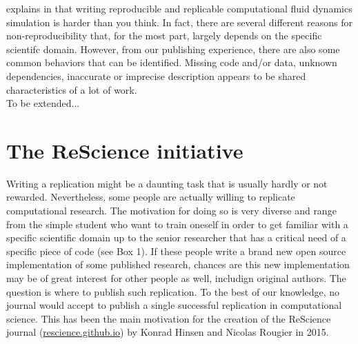 \documentclass[a4paper,10pt, twocolumn]{article}
\begin{document}
\citeauthor{Mesnard:2016} explains in \citep{Mesnard:2016} that writing
reproducible and replicable computational fluid dynamics simulation is harder
than you think. In fact, there are several different reasons for
non-reproducibility that, for the most part, largely depends on the specific
scientifc domain. However, from our publishing experience, there are also some
common behaviors that can be identified. Missing code and/or data, unknown
dependencies, inaccurate or imprecise description appears to be shared
characteristics of a lot of work.\\

To be extended...

\section*{The ReScience initiative}

Writing a replication might be a daunting task that is usually hardly or not
rewarded. Nevertheless, some people are actually willing to replicate
computational research. The motivation for doing so is very diverse and range
from the simple student who want to train oneself in order to get familiar with
a specific scientific domain up to the senior researcher that has a critical
need of a specific piece of code (see Box 1). If these people write a brand new
open source implementation of some published research, chances are this new
implementation may be of great interest for other people as well, includign
original authors. The question is where to publish such replication. To the
best of our knowledge, no journal would accept to publish a single successful
replication in computational science. This has been the main motivation for the
creation of the ReScience journal (\url{rescience.github.io}) by Konrad Hinsen
and Nicolas Rougier in 2015.\\
\end{document}
